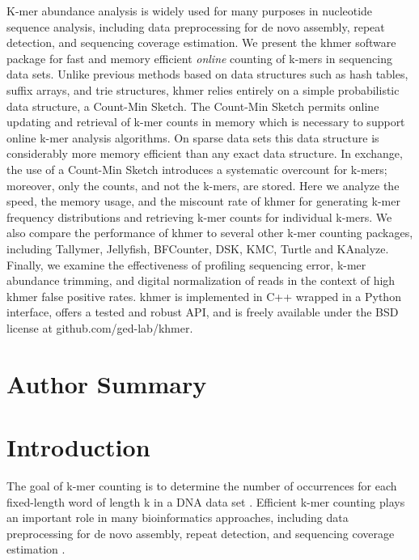 \documentclass[10pt]{article}
\begin{document}
K-mer abundance analysis is widely used for many purposes in nucleotide sequence
analysis, including data preprocessing for de novo assembly, repeat
detection, and sequencing coverage estimation.  We present the khmer
software package for fast and memory efficient {\em online} counting
of k-mers in sequencing data sets. Unlike previous methods based on
data structures such as hash tables, suffix arrays, and trie
structures, khmer relies entirely on a simple probabilistic data
structure, a Count-Min Sketch.  The Count-Min Sketch permits online
updating and retrieval of k-mer counts in memory which is necessary to
support online k-mer analysis algorithms.  On sparse data sets this
data structure is considerably more memory efficient than any exact
data structure.  In exchange, the use of a Count-Min Sketch introduces
a systematic overcount for k-mers; moreover, only the counts, and not
the k-mers, are stored.  Here we analyze the speed, the memory usage,
and the miscount rate of khmer for generating k-mer frequency
distributions and retrieving k-mer counts for individual k-mers.  We
also compare the performance of khmer to several other k-mer counting
packages, including Tallymer, Jellyfish, BFCounter, DSK, KMC, Turtle
 and KAnalyze.
Finally, we examine
the effectiveness of profiling sequencing error, k-mer abundance
trimming, and digital normalization of reads in the context of high
khmer false positive rates. khmer is implemented in C++ wrapped in a Python
interface, offers a tested and robust API, and is freely available
under the BSD license at github.com/ged-lab/khmer.


\section*{Author Summary}

\section*{Introduction}

The goal of k-mer counting is to determine the number of occurrences
for each fixed-length word of length k in a DNA data set
\cite{Marcais2011}. Efficient k-mer counting plays an important role
in many bioinformatics approaches, including data preprocessing for de
novo assembly, repeat detection, and sequencing coverage estimation
\cite{Kurtz2008}.
\end{document}
